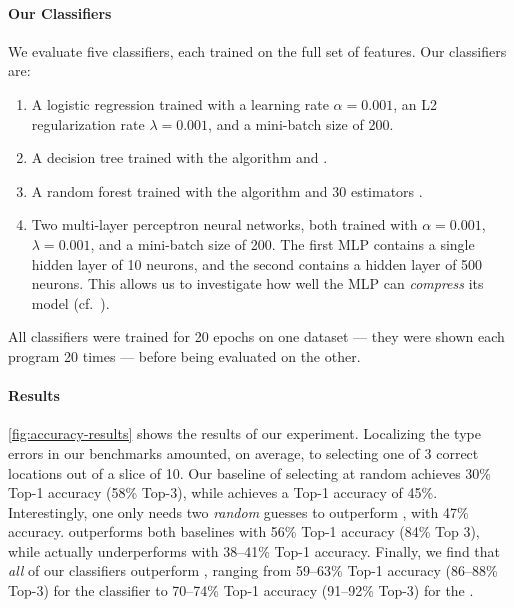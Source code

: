 \paragraph{Our Classifiers}
We evaluate five classifiers, each trained on the full set of features.
%
%
Our classifiers are:
%
\begin{enumerate}
\item A logistic regression trained with a learning rate
  $\alpha = 0.001$, an L2 regularization rate $\lambda = 0.001$, and a
  mini-batch size of 200.
\item A decision tree trained with the  algorithm and .
\item A random forest trained with the  algorithm and 30 estimators .
\item Two multi-layer perceptron neural networks, both trained with $\alpha = 0.001$,
  $\lambda = 0.001$, and a mini-batch size of 200. The first MLP
  contains a single hidden layer of 10 neurons, and the second contains
  a hidden layer of 500 neurons. This allows us to investigate how well
  the MLP can \emph{compress} its model (cf.~\cite{FIXME}).
\end{enumerate}
%
All classifiers were trained for 20 epochs on one dataset
--- \ie they were shown each program 20 times ---
before being evaluated on the other.



\paragraph{Results}
\autoref{fig:accuracy-results} shows the results of our experiment.
%
Localizing the type errors in our benchmarks amounted, on average, to
selecting one of 3 correct locations out of a slice of 10.
%
Our baseline of selecting at random achieves 30\% Top-1
accuracy (58\% Top-3), while \ocaml achieves a Top-1 accuracy of 45\%.
%
Interestingly, one only needs two \emph{random} guesses to outperform
\ocaml, with 47\% accuracy.
%
\sherrloc outperforms both baselines with 56\% Top-1 accuracy (84\% Top
3), while \mycroft actually underperforms \ocaml with 38--41\% Top-1
accuracy.
%
Finally, we find that \emph{all} of our classifiers outperform \sherrloc,
ranging from 59--63\% Top-1 accuracy (86--88\% Top-3) for the \linear
classifier to 70--74\% Top-1 accuracy (91--92\% Top-3) for the \hiddenFH.


